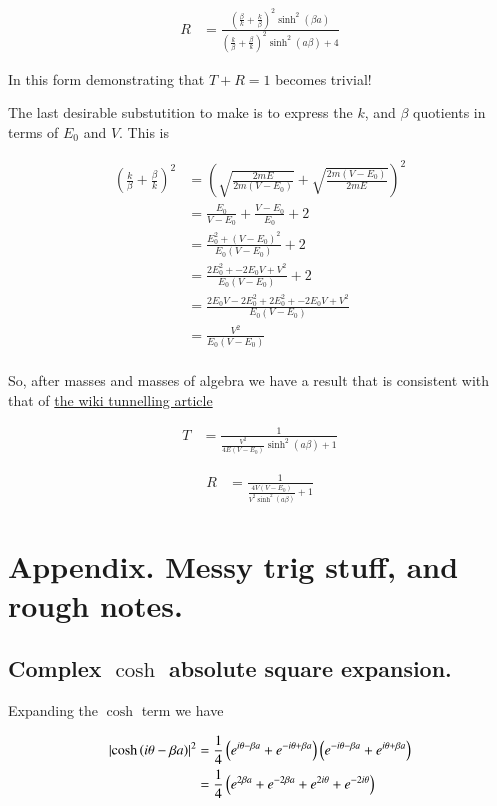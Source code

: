\documentclass{article}
\begin{document}
\begin{align}
R 
&= \frac{ 
\left(\frac{\beta}{k} + \frac{k}{\beta} \right)^2 
\sinh^2( \beta a)} { 
\left( \frac{k}{\beta} +\frac{\beta}{k} \right)^2 
\sinh^2(a \beta) + 4 
}
\end{align}

In this form demonstrating that $T + R=1$ becomes trivial!

The last desirable substutition to make is to express the $k$, and $\beta$ quotients in terms of $E_0$ and $V$.  This is

\begin{align*}
\left(\frac{k}{\beta} + \frac{\beta}{k}\right)^2
&=
\left(\sqrt{\frac{2mE}{2m(V-E_0)}} + \sqrt{\frac{2m(V-E_0)}{2mE}}\right)^2 \\
&=
\frac{E_0}{V-E_0} + \frac{V-E_0}{E_0} + 2 \\
&=
\frac{E_0^2 + (V-E_0)^2}{E_0(V-E_0)} + 2 \\
&=
\frac{2 E_0^2 + -2 E_0 V + V^2 }{E_0(V-E_0)} + 2 \\
&=
\frac{2 E_0 V -2 E_0^2 + 2 E_0^2 + -2 E_0 V + V^2 }{E_0(V-E_0)} \\
&=
\frac{V^2 }{E_0(V-E_0)} \\
\end{align*}

So, after masses and masses of algebra we have a result that is consistent with that of
\href{http://en.wikipedia.org/wiki/Potential_barrier}{the wiki tunnelling article}

\begin{align}
T 
&= \frac{1} { \frac{V^2}{4E(V-E_0)} \sinh^2(a \beta) + 1 }
\end{align}

\begin{align}
R 
&= \frac{1} { \frac{4V(V-E_0)}{V^2 \sinh^2(a \beta)} + 1 }
\end{align}

\section{ Appendix.  Messy trig stuff, and rough notes. }

\subsection{ Complex $\cosh$ absolute square expansion. }

Expanding the $\cosh$ term we have

\begin{align*}
\left\lvert{\cosh\left( i\theta -\beta a \right)}\right\rvert^2
&=
\frac{1}{4}
\left(
e^{i\theta - \beta a}
+ e^{-i\theta + \beta a}
\right)
\left(
e^{-i\theta - \beta a}
+ e^{i\theta + \beta a}
\right) \\
&=
\frac{1}{4}\left(
e^{2\beta a}
+ e^{-2\beta a}
+e^{2i\theta }
+e^{-2i\theta }
\right) \\
\end{align*}
\end{document}
